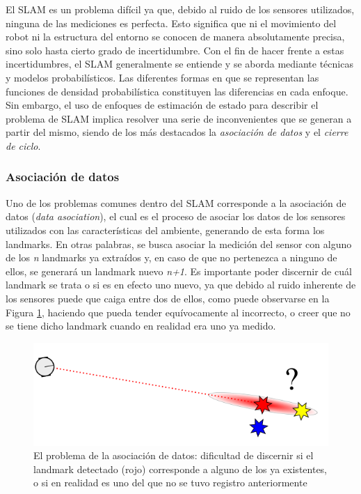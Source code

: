 El SLAM es un problema difícil ya que, debido al ruido de los sensores utilizados, ninguna de las mediciones es perfecta. Esto significa que ni el movimiento del robot ni la estructura del entorno se conocen de manera absolutamente precisa, sino solo hasta cierto grado de incertidumbre. Con el fin de hacer frente a estas incertidumbres, el SLAM generalmente se entiende y se aborda mediante técnicas y modelos probabilísticos. Las diferentes formas en que se representan las funciones de densidad probabilística constituyen las diferencias en cada enfoque. 
Sin embargo, el uso de enfoques de estimación de estado para describir el problema de SLAM implica resolver una serie de inconvenientes que se generan a partir del mismo, siendo de los más destacados la \textit{asociación de datos} \cite{duarrant2006a}\cite{duarrant2006b} y el \textit{cierre de ciclo}.

\subsubsection{Asociación de datos}
Uno de los problemas comunes dentro del SLAM corresponde a la asociación de datos (\textit{data asociation}), el cual es el proceso de asociar los datos de los sensores utilizados con las características del ambiente, generando de esta forma los landmarks. En otras palabras, se busca asociar la medición del sensor con alguno de los \textit{n} landmarks ya extraídos y, en caso de que no pertenezca a ninguno de ellos, se generará un landmark nuevo \textit{n+1}. Es importante poder discernir de cuál landmark se trata o si es en efecto uno nuevo, ya que debido al ruido inherente de los sensores puede que caiga entre dos de ellos, como puede observarse en la Figura \ref{fig:dataassociation}, haciendo que pueda tender equívocamente al incorrecto, o creer que no se tiene dicho landmark cuando en realidad era uno ya medido.

\begin{figure}[!ht]
    \centering
    \includegraphics[width=\textwidth]{Img/DataAssociation.png}
    \caption{El problema de la asociación de datos: dificultad de discernir si el landmark detectado (rojo) corresponde a alguno de los ya existentes, o si en realidad es uno del que no se tuvo registro anteriormente}
    \label{fig:dataassociation}
\end{figure}


